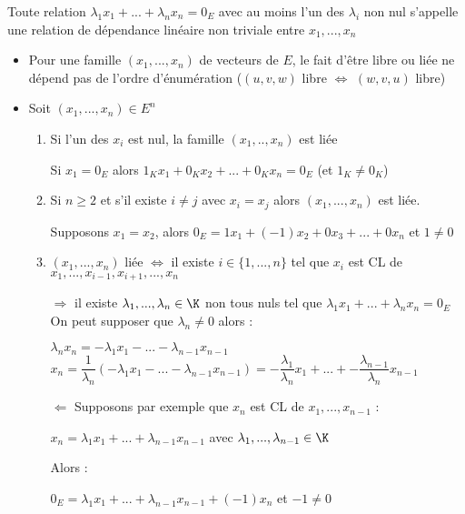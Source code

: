 \documentclass[12pt, a4paper]{report}
\begin{document}
\begin{remarque}[Vocabulaire]
Toute relation $\lambda_1 x_1 + ... + \lambda_n x_n = 0_E$ avec au moins l'un des $\lambda_i$ non nul s'appelle une relation de dépendance linéaire non triviale entre $x_1,..., x_n$
\end{remarque}

\begin{remarque}
\begin{itemize}
    \item Pour une famille $(x_1,...,x_n)$ de vecteurs de $E$, le fait d'être libre ou liée ne dépend pas de l'ordre d'énumération ($(u,v,w)$ libre $\Longleftrightarrow$ $(w,v,u)$ libre)
    \item Soit $(x_1,...,x_n) \in E^n$\\
    \begin{enumerate}
        \item Si l'un des $x_i$ est nul, la famille $(x_1,..,x_n)$ est liée
        \begin{demo}
        Si $x_1 = 0_E$ alors $1_K x_1 + 0_K x_2 + ... + 0_K x_n = 0_E$ (et $1_K \neq 0_K$)
        \end{demo}
        \item Si $n \geq 2$ et s'il existe $i \neq j$ avec $x_i = x_j$ alors $(x_1 , ... , x_n)$ est liée. 
        \begin{demo}
        Supposons $x_1 = x_2$, alors $0_E = 1 x_1 + (-1)x_2 + 0x_3 + ...+ 0x_n$ et $1\neq 0$
        \end{demo}
        \item $(x_1,...,x_n)$ liée $\Longleftrightarrow$ il existe $i \in \lbrace 1,...,n \rbrace$ tel que $x_i$ est CL de $x_1 , ..., x_{i-1}, x_{i+1}, ..., x_n$
        \begin{demo}
        $\Longrightarrow$ il existe $\lambda_1,...,\lambda_n \in \K$ non tous nuls tel que $\lambda_1 x_1 + ... + \lambda_n x_n = 0_E$\\
        On peut supposer que $\lambda_n \neq 0$ alors : 
        \begin{center}
            $\lambda_n x_n = -\lambda_1 x_1 - ... - \lambda_{n-1} x_{n-1}$\\
            $x_n = \dfrac{1}{\lambda_n} (-\lambda_1 x_1 - ... - \lambda_{n-1} x_{n-1}) = - \dfrac{\lambda_1}{\lambda_n} x_1 + ... + -\dfrac{\lambda_{n-1}}{\lambda_n} x_{n-1}$
        \end{center}
        
        $\Longleftarrow$ Supposons par exemple que $x_n$ est CL de $x_1 , ... , x_{n-1}$ :
        \begin{center}
            $x_n = \lambda_1 x_1 + ... + \lambda_{n-1} x_{n-1}$ avec $\lambda_1 , ..., \lambda_{n-1} \in \K$
        \end{center}
        Alors :
        \begin{center}
            $0_E = \lambda_1 x_1 + ... + \lambda_{n-1} x_{n-1} + (-1)x_n$ et $-1\neq 0$
        \end{center}
        \end{demo}
    \end{enumerate}
\end{itemize}
\end{remarque}
\end{document}
